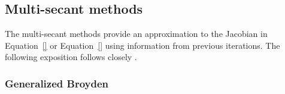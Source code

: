 
\subsection{Multi-secant methods}

The multi-secant methods provide an approximation to the Jacobian in Equation~\eqref{} or Equation~\eqref{} using information from previous iterations.
The following exposition follows closely \cite{fang_two_2009}.

\subsubsection{Generalized Broyden}

